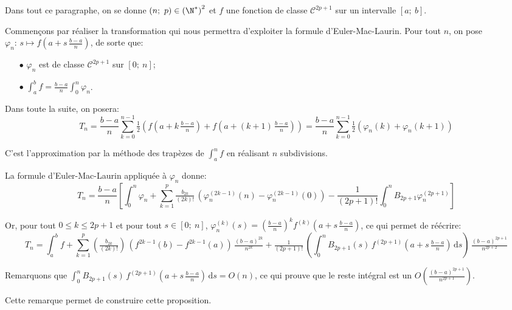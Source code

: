Dans tout ce paragraphe, on se donne $(n;~p) \in \left (\N^*\right )^2$ et $f$ une fonction de classe $\mathcal{C}^{2p+1}$ sur un intervalle $[a;~b]$. 

\medskip
Commençons par réaliser la transformation qui nous permettra d'exploiter la formule d'Euler-Mac-Laurin.
Pour tout $n$, on pose $\varphi_n: \, s \mapsto f\left ( a + s \, \tfrac{b-a}{n}\right )$, de sorte que:
\begin{itemize}
\item[$\bullet$] 
$\varphi_n$ est de classe $\mathcal{C}^{2p+1}$ sur $[0;~n]$;
\item[$\bullet$] 
$\displaystyle{\int_a^b} f = \frac{b-a}{n} \displaystyle{\int_0^n} \varphi_n$.
\end{itemize}

Dans toute la suite, on posera:
\[
T_n = \frac{b-a}{n} \displaystyle{\sum_{k=0}^{n-1}} \tfrac{1}{2}\left ( f\left ( a + k \, \tfrac{b-a}{n}\right ) + f\left ( a + (k+1) \, \tfrac{b-a}{n}\right ) \right ) = \frac{b-a}{n} \displaystyle{\sum_{k=0}^{n-1}} \tfrac{1}{2} \left ( \varphi_n(k) + \varphi_n(k+1)\right )
\]

C'est l'approximation par la méthode des trapèzes de $\displaystyle{\int_a^n} f$ en réalisant $n$ subdivisions.

\medskip
La formule d'Euler-Mac-Laurin appliquée à $\varphi_n$ donne:
\[
T_n = \frac{b-a}{n}\left [ \displaystyle{\int_0^n} \varphi_n +\displaystyle{\sum_{k=1}^p} \tfrac{b_{2k}}{(2k)!} \, \left ( \varphi_n^{(2k-1)}(n) - \varphi_n^{(2k-1)}(0) \right ) - \frac{1}{(2p+1)!} \displaystyle{\int_0^n} B_{2p+1} \varphi_n^{(2p+1)} \right ]
\]

Or, pour tout $0 \leq k \leq 2p+1$ et pour tout $s \in [0;~n]$, $\varphi_n^{(k)}(s) = \left ( \frac{b-a}{n}\right )^k f^{(k)} \left ( a + s \, \tfrac{b-a}{n} \right )$, ce qui permet de réécrire:
\[
T_n = \displaystyle{\int_a^b} f + \displaystyle{\sum_{k=1}^p} \left (\tfrac{b_{2k}}{(2k)!}\right ) \, \left ( f^{2k-1}(b) - f^{2k-1}(a) \right ) \, \tfrac{(b-a)^{2k}}{n^{2k}} + \tfrac{1}{(2p+1)!} \, \left ( \displaystyle{\int_0^n} B_{2p+1}(s) \, f^{(2p+1)} \left ( a + s \, \tfrac{b-a}{n} \right )  \,  \mathrm d s \right ) \, \tfrac{(b-a)^{2p+1}}{n^{2p+2}}
\]

Remarquons que $\displaystyle{\int_0^n} B_{2p+1}(s) \, f^{(2p+1)} \left ( a + s \, \tfrac{b-a}{n} \right )  \,  \mathrm d s = O\left (n  \right )$, ce qui prouve que le reste intégral est un $O\left ( \frac{(b-a)^{2p+1}}{n^{2p+1}}\right )$.

Cette remarque permet de construire cette proposition.

